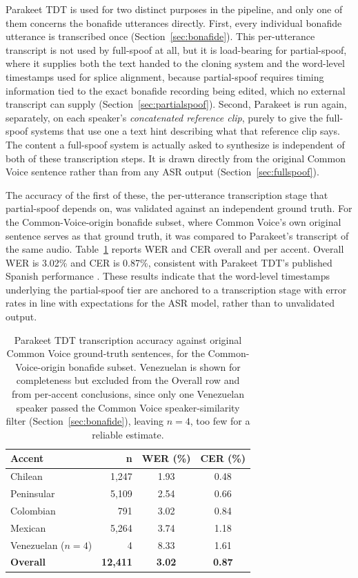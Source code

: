 \documentclass[11pt]{report}
\begin{document}
Parakeet TDT is used for two distinct purposes in the pipeline, and
only one of them concerns the bonafide utterances directly. First,
every individual bonafide utterance is transcribed once
(Section~\ref{sec:bonafide}). This per-utterance transcript is not used
by full-spoof at all, but it is load-bearing for partial-spoof, where
it supplies both the text handed to the cloning system and the
word-level timestamps used for splice alignment, because partial-spoof
requires timing information tied to the exact bonafide recording being
edited, which no external transcript can supply
(Section~\ref{sec:partialspoof}). Second, Parakeet is run again,
separately, on each speaker's \emph{concatenated reference clip},
purely to give the full-spoof systems that use one a text hint
describing what that reference clip says. The content a full-spoof
system is actually asked to synthesize is independent of both of these
transcription steps. It is drawn directly from the original Common
Voice sentence rather than from any ASR output (Section~\ref{sec:fullspoof}).

The accuracy of the first of these, the per-utterance transcription
stage that partial-spoof depends on, was validated against an
independent ground truth. For the Common-Voice-origin bonafide subset,
where Common Voice's own original sentence serves as that ground truth,
it was compared to Parakeet's transcript of the same audio.
Table~\ref{tab:parakeetwer} reports WER and CER overall and per accent.
Overall WER is 3.02\% and CER is 0.87\%, consistent with Parakeet TDT's
published Spanish performance \citep{parakeet}. These results indicate
that the word-level timestamps underlying the partial-spoof tier are
anchored to a transcription stage with error rates in line with
expectations for the ASR model, rather than to unvalidated output.

\begin{table}[H]
\centering
\caption{Parakeet TDT transcription accuracy against original Common
Voice ground-truth sentences, for the Common-Voice-origin bonafide
subset. Venezuelan is shown for completeness but excluded from the
Overall row and from per-accent conclusions, since only one Venezuelan
speaker passed the Common Voice speaker-similarity filter
(Section~\ref{sec:bonafide}), leaving $n=4$, too few for a reliable
estimate.}
\label{tab:parakeetwer}
\small
\begin{tabular}{lrcc}
\toprule
\textbf{Accent} & \textbf{n} & \textbf{WER (\%)} & \textbf{CER (\%)} \\
\midrule
Chilean       &  1{,}247 & 1.93 & 0.48 \\
Peninsular    &  5{,}109 & 2.54 & 0.66 \\
Colombian     &    791 & 3.02 & 0.84 \\
Mexican       &  5{,}264 & 3.74 & 1.18 \\
Venezuelan ($n{=}4$) &   4 & 8.33 & 1.61 \\
\midrule
\textbf{Overall} & \textbf{12{,}411} & \textbf{3.02} & \textbf{0.87} \\
\bottomrule
\end{tabular}
\end{table}
\end{document}
